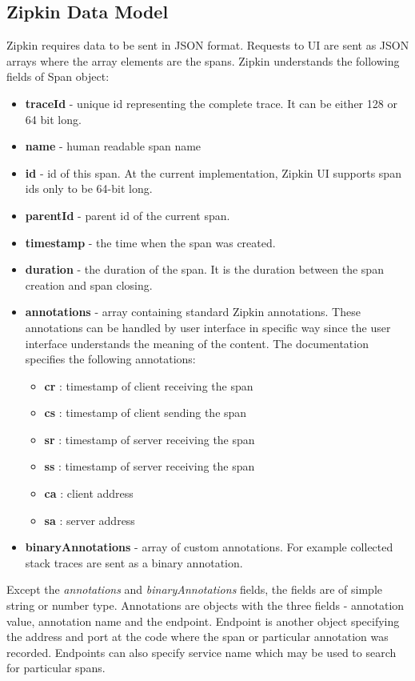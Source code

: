 \subsection{Zipkin Data Model}
Zipkin requires data to be sent in JSON format. Requests to UI are sent as JSON arrays where the array elements are the spans. Zipkin understands the following fields of Span object:
\begin{itemize}
	\item \textbf{traceId} - unique id representing the complete trace. It can be either 128 or 64 bit long.
	\item \textbf{name} - human readable span name
	\item \textbf{id} - id of this span. At the current implementation, Zipkin UI supports span ids only to be 64-bit long.
	\item \textbf{parentId} - parent id of the current span.
	\item \textbf{timestamp} - the time when the span was created.
	\item \textbf{duration} - the duration of the span. It is the duration between the span creation and span closing.
	\item \textbf{annotations} - array containing standard Zipkin annotations. These annotations can be handled by user interface in specific way since the user interface understands the meaning of the content. The documentation specifies the following annotations:
	\begin{itemize}
		\item \textbf{cr} : timestamp of client receiving the span
		\item \textbf{cs} : timestamp of client sending the span
		\item \textbf{sr} : timestamp of server receiving the span
		\item \textbf{ss} : timestamp of server receiving the span
		\item \textbf{ca} : client address
		\item \textbf{sa} : server address
	\end{itemize}
	\item \textbf{binaryAnnotations} - array of custom annotations. For example collected stack traces are sent as a binary annotation.
\end{itemize}

Except the \textit{annotations} and \textit{binaryAnnotations} fields, the fields are of simple string or number type. Annotations are objects with the three fields - annotation value, annotation name and the endpoint. Endpoint is another object specifying the address and port at the code where the span or particular annotation was recorded. Endpoints can also specify service name which may be used to search for particular spans.

